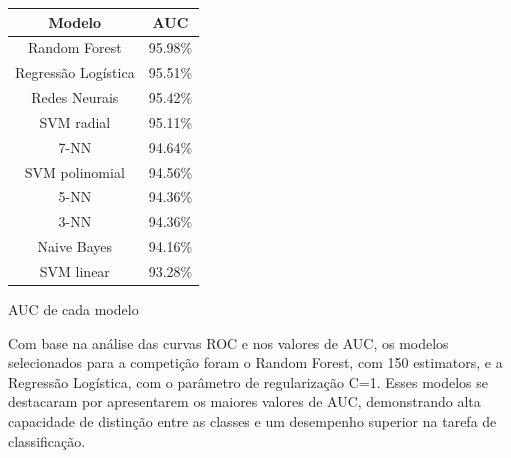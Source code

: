 \documentclass[10pt, conference, compsocconf]{IEEEtran}
\begin{document}
\vspace{0.3cm}
\begin{center}
{\scriptsize
\begin{tabular}{|c|c|}
\hline 
Modelo & AUC \\ 
\hline
Random Forest & 95.98\% \\ 
\hline
Regressão Logística & 95.51\% \\ 
\hline
Redes Neurais & 95.42\%  \\ 
\hline
SVM radial & 95.11\% \\ 
\hline
7-NN & 94.64\% \\ 
\hline
SVM polinomial & 94.56\% \\ 
\hline
5-NN & 94.36\% \\ 
\hline
3-NN & 94.36\% \\ 
\hline
Naive Bayes & 94.16\% \\ 
\hline
SVM linear & 93.28\% \\ 
\hline
\end{tabular}
}
\vspace{0.1cm}
\par {\scriptsize AUC de cada modelo}
\end{center}
\vspace{0.2cm}

Com base na análise das curvas ROC e nos valores de AUC, os modelos selecionados para a competição foram o Random Forest, 
com 150 estimators, e a Regressão Logística, com o parâmetro de regularização C=1. Esses modelos se destacaram por apresentarem os maiores valores de 
AUC, demonstrando alta capacidade de distinção entre as classes e um desempenho superior na tarefa de classificação. 
\end{document}

